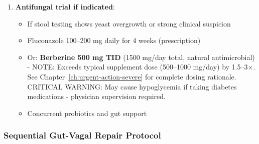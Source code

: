 \begin{enumerate}
    \item \textbf{Antifungal trial if indicated}:
    \begin{itemize}
        \item If stool testing shows yeast overgrowth or strong clinical suspicion
        \item Fluconazole 100--200 mg daily for 4 weeks (prescription)
        \item Or: \textbf{Berberine 500 mg TID} (1500 mg/day total, natural antimicrobial) - NOTE: Exceeds typical supplement dose (500--1000 mg/day) by 1.5--3$\times$. See Chapter~\ref{ch:urgent-action-severe} for complete dosing rationale. CRITICAL WARNING: May cause hypoglycemia if taking diabetes medications - physician supervision required.
        \item Concurrent probiotics and gut support
    \end{itemize}
\end{enumerate}

\subsubsection{Sequential Gut-Vagal Repair Protocol}
\label{subsubsec:gut-vagal-protocol}

